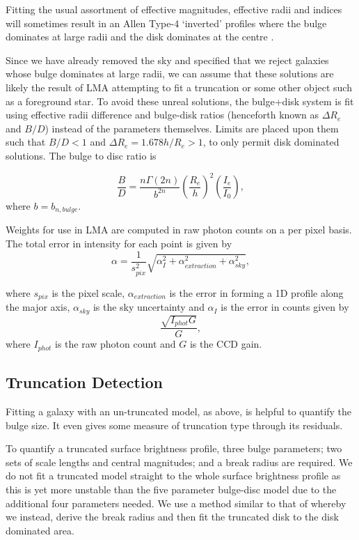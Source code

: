 Fitting the usual assortment of effective magnitudes, effective radii and \sersic indices will sometimes result in an Allen Type-4 `inverted' profiles where the bulge dominates at large radii and the disk dominates at the centre \citep{allen_millennium_2006}. 

	Since we have already removed the sky and specified that we reject galaxies whose bulge dominates at large radii, we can assume that these solutions are likely the result of LMA attempting to fit a truncation or some other object such as a foreground star. To avoid these unreal solutions, the bulge+disk system is fit using effective radii difference and bulge-disk ratios (henceforth known as $\Delta R_e$ and $B/D$) instead of the parameters themselves. Limits are placed upon them such that $B/D < 1$ and $\Delta R_e = 1.678 h / R_e > 1$, to only permit disk dominated solutions. The bulge to disc ratio is

	\begin{equation}
		\frac{B}{D} = \frac{n \Gamma(2n)}{b^{2n}}\left(\frac{R_e}{h}\right)^{2} \left(\frac{I_e}{I_0}\right),
	\end{equation}
	where $b = b_{n,bulge}$.

Weights for use in LMA are computed in raw photon counts on a per pixel basis. The total error in intensity for each point is given by 
\begin{equation}
	\alpha = \frac{1}{s_{pix}^2}\sqrt{\alpha_I^2 + \alpha_{extraction}^2 + \alpha_{sky}^2},
\end{equation}

where $s_{pix}$ is the pixel scale, $\alpha_{extraction}$ is the error in forming a 1D profile along the major axis, $\alpha_{sky}$ is the sky uncertainty and $\alpha_I$ is the error in counts given by 
\begin{equation}
	\frac{\sqrt{I_{phot}G}}{G},
\end{equation}
where $I_{phot}$ is the raw photon count and $G$ is the CCD gain.

\subsection{Truncation Detection}
Fitting a galaxy with an un-truncated model, as above, is helpful to quantify the bulge size. It even gives some measure of truncation type through its residuals. 

To quantify a truncated surface brightness profile, three bulge parameters; two sets of scale lengths and central magnitudes; and a break radius are required. We do not fit a truncated model straight to the whole surface brightness profile as this is yet more unstable than the five parameter bulge-disc model due to the additional four parameters needed. We use a method similar to that of \citet{pohlen_structure_2006} whereby we instead, derive the break radius and then fit the truncated disk to the disk dominated area.

